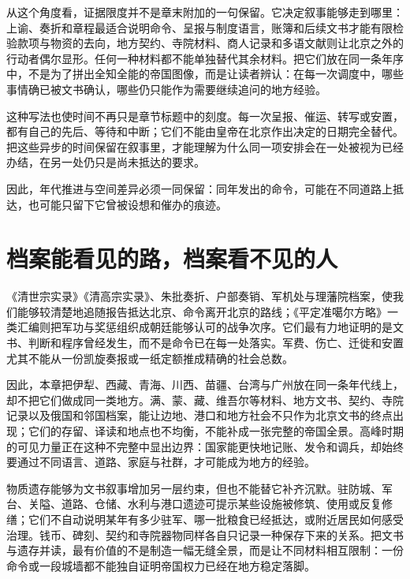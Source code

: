 从这个角度看，证据限度并不是章末附加的一句保留。它决定叙事能够走到哪里：上谕、奏折和章程最适合说明命令、呈报与制度语言，账簿和后续文书才能有限检验款项与物资的去向，地方契约、寺院材料、商人记录和多语文献则让北京之外的行动者偶尔显形。任何一种材料都不能单独替代其余材料。把它们放在同一条年序中，不是为了拼出全知全能的帝国图像，而是让读者辨认：在每一次调度中，哪些事情确已被文书确认，哪些仍只能作为需要继续追问的地方经验。

这种写法也使时间不再只是章节标题中的刻度。每一次呈报、催运、转写或安置，都有自己的先后、等待和中断；它们不能由皇帝在北京作出决定的日期完全替代。把这些异步的时间保留在叙事里，才能理解为什么同一项安排会在一处被视为已经办结，在另一处仍只是尚未抵达的要求。

因此，年代推进与空间差异必须一同保留：同年发出的命令，可能在不同道路上抵达，也可能只留下它曾被设想和催办的痕迹。
\section{档案能看见的路，档案看不见的人}

《清世宗实录》《清高宗实录》、朱批奏折、户部奏销、军机处与理藩院档案，使我们能够较清楚地追随报告抵达北京、命令离开北京的路线；《平定准噶尔方略》一类汇编则把军功与奖惩组织成朝廷能够认可的战争次序。它们最有力地证明的是文书、判断和程序曾经发生，而不是命令已在每一处落实。军费、伤亡、迁徙和安置尤其不能从一份凯旋奏报或一纸定额推成精确的社会总数。

因此，本章把伊犁、西藏、青海、川西、苗疆、台湾与广州放在同一条年代线上，却不把它们做成同一类地方。满、蒙、藏、维吾尔等材料、地方文书、契约、寺院记录以及俄国和邻国档案，能让边地、港口和地方社会不只作为北京文书的终点出现；它们的存留、译读和地点也不均衡，不能补成一张完整的帝国全景。高峰时期的可见力量正在这种不完整中显出边界：国家能更快地记账、发令和调兵，却始终要通过不同语言、道路、家庭与社群，才可能成为地方的经验。

物质遗存能够为文书叙事增加另一层约束，但也不能替它补齐沉默。驻防城、军台、关隘、道路、仓储、水利与港口遗迹可提示某些设施被修筑、使用或反复修缮；它们不自动说明某年有多少驻军、哪一批粮食已经抵达，或附近居民如何感受治理。钱币、碑刻、契约和寺院器物同样各自只记录一种保存下来的关系。把文书与遗存并读，最有价值的不是制造一幅无缝全景，而是让不同材料相互限制：一份命令或一段城墙都不能独自证明帝国权力已经在地方稳定落脚。





